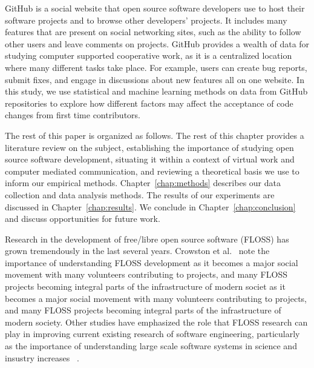 \documentclass{iitthesis}
\begin{document}
\textpages     %


GitHub is a social website that open source software developers use to host
their software projects and to browse other developers' projects. It includes
many features that are present on social networking sites, such as the ability
to follow other users and leave comments on projects. GitHub provides a wealth
of data for studying computer supported cooperative work, as it is a
centralized location where many different tasks take place. For example, users
can create bug reports, submit fixes, and engage in discussions about new
features all on one website.  In this study, we use statistical and machine
learning methods on data from GitHub repositories to explore how different
factors may affect the acceptance of code changes from first time contributors.

The rest of this paper is organized as follows. The rest of this chapter
provides a literature review on the subject, establishing the importance of
studying open source software development, situating it within a context of
virtual work and computer mediated communication, and reviewing a theoretical
basis we use to inform our empirical methods. Chapter~\ref{chap:methods}
describes our data collection and data analysis methods. The results of our
experiments are discussed in Chapter~\ref{chap:results}. We conclude in
Chapter~\ref{chap:conclusion} and discuss opportunities for future work.


 \label{sec:relatedwork}

Research in the development of free/libre open source software (FLOSS) has
grown tremendously in the last several years. Crowston et
al.~\cite{crowston_free/libre_2008} note the importance of understanding FLOSS
development as it becomes a major social movement with many volunteers
contributing to projects, and many FLOSS projects becoming integral parts of the
infrastructure of modern societ as it becomes a major social movement with many
volunteers contributing to projects, and many FLOSS projects becoming
integral parts of the infrastructure of modern society. Other studies have
emphasized the role that FLOSS research can play in improving current existing
research of software engineering, particularly as the importance of
understanding large scale software systems in science and insustry
increases ~\cite{scacchi_free/open_2007}.
\end{document}
